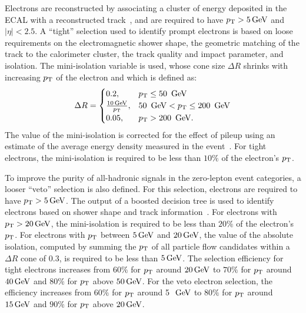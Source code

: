 Electrons are reconstructed by associating a cluster of
energy deposited in the ECAL with a reconstructed track~\cite{Khachatryan:2015hwa}, 
and are required to have $p_{\mathrm{T}} > 5 \,\text{Ge\hspace{-.08em}V}$ and $|\eta|<2.5$. A ``tight'' selection
used to identify prompt electrons is based on loose requirements
on the electromagnetic shower shape, the geometric matching of
the track to the calorimeter cluster, the track quality and impact
parameter, and isolation. The mini-isolation variable is used,
whose cone size $\Delta R$ shrinks with increasing $p_{\mathrm{T}}$ of the 
electron and which is defined as:
\begin{eqnarray}
 \label{eq:miniIsolation}
 \Delta R= 
 \begin{cases}
 0.2, & p_{\mathrm{T}} \le 50\ \,\text{Ge\hspace{-.08em}V}\\
 \frac{10 \,\text{Ge\hspace{-.08em}V}}{p_{\mathrm{T}}}, & 50\ \,\text{Ge\hspace{-.08em}V} < p_{\mathrm{T}} \le 200\ \,\text{Ge\hspace{-.08em}V} \\
 0.05, & p_{\mathrm{T}} > 200\ \,\text{Ge\hspace{-.08em}V}. \\
\end{cases}
 \end{eqnarray}
The value of the mini-isolation is corrected for the effect of pileup using an estimate of 
the average energy density measured in the event~\cite{CMS-PAS-JME-14-001}. 
For tight electrons, the mini-isolation is required to be less than $10\%$ of 
the electron's $p_{\mathrm{T}}$.

To improve the purity of all-hadronic signals in the zero-lepton event categories, a looser ``veto''
selection is also defined.  For this selection, electrons are required to have $p_{\mathrm{T}}>5 \,\text{Ge\hspace{-.08em}V}$.  The output of a boosted decision tree is used to identify electrons based on shower
shape and track information~\cite{Khachatryan:2015hwa}.  
For electrons with $p_{\mathrm{T}}>20 \,\text{Ge\hspace{-.08em}V}$, the mini-isolation is required to be less than $20\%$ of the 
electron's $p_{\mathrm{T}}$.  For electrons with $p_{\mathrm{T}}$ between $5 \,\text{Ge\hspace{-.08em}V}$ and $20 \,\text{Ge\hspace{-.08em}V}$, the value of the 
absolute isolation, computed by summing the $p_{\mathrm{T}}$ of all particle flow candidates within a 
$\Delta R$ cone of 0.3, is required to be less than $5 \,\text{Ge\hspace{-.08em}V}$.  
The selection efficiency for tight electrons increases from $60\%$ for
$p_{\mathrm{T}}$ around $20 \,\text{Ge\hspace{-.08em}V}$
to $70\%$ for $p_{\mathrm{T}}$ around $40 \,\text{Ge\hspace{-.08em}V}$ and $80\%$ for $p_{\mathrm{T}}$ above $50 \,\text{Ge\hspace{-.08em}V}$. 
For the veto electron selection, the efficiency increases from $60\%$ for $p_{\mathrm{T}}$ around 5~$\,\text{Ge\hspace{-.08em}V}$
to $80\%$ for $p_{\mathrm{T}}$ around $15 \,\text{Ge\hspace{-.08em}V}$ and $90\%$ for $p_{\mathrm{T}}$ above $20 \,\text{Ge\hspace{-.08em}V}$. 

